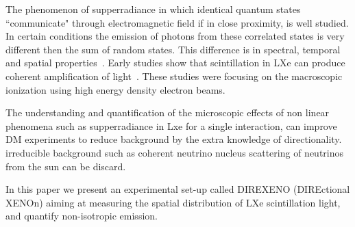 The phenomenon of supperradiance in which identical quantum states ``communicate" through electromagnetic field if in close proximity, 
is well studied. In certain conditions the emission of photons from these correlated states is very different then the sum of random states. 
This difference is in spectral, temporal and spatial properties~\cite{DickeSR,GROSS1982301}. Early studies show that scintillation in LXe can 
produce coherent amplification of light~\cite{BasovSRTheory,MiesSRExp}. These studies were focusing on the macroscopic ionization using high 
energy density electron beams. 

The understanding and quantification of the microscopic effects of non linear phenomena such as supperradiance in Lxe for a single interaction, 
can improve DM experiments to reduce background by the extra knowledge of directionality. irreducible background such as coherent neutrino nucleus 
scattering of neutrinos from the sun can be discard.

In this paper we present an experimental set-up called DIREXENO (DIREctional XENOn) aiming at measuring the spatial distribution of LXe scintillation 
light, and quantify non-isotropic emission.   